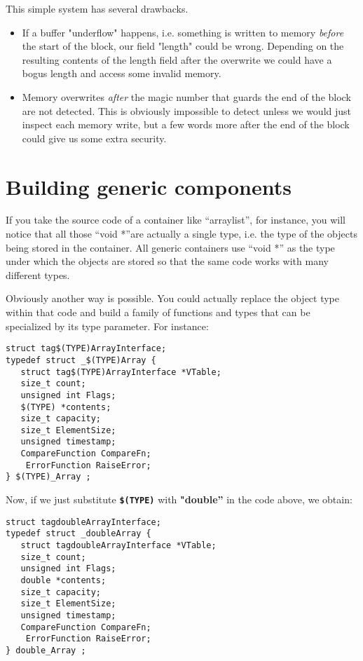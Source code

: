 \documentclass[12pt,a4paper]{memoir} %
\begin{document}
{{This simple system has several drawbacks.
\begin{itemize}
\item If a buffer "underflow" happens, i.e. something is written to memory \textsl{before} the start of the block, our field "length" could be
wrong. Depending on the resulting contents of the length field after the overwrite we could have a bogus length and access some invalid memory.
\item Memory overwrites \textsl{after} the magic number that guards the end of the block are not detected. This is obviously impossible to detect
unless we would just inspect each memory write, but a few words more after the end of the block could give us some extra security.
\end{itemize}
\chapter{Building generic components}

If you take the source code of a container like “arraylist”, for instance, you will notice that all those “void *”are actually a single type, i.e. the type of the objects being stored in the container.  All generic containers use “void *” as the type under which the objects are stored so that the same code works with many different types.

Obviously another way is possible. You could actually replace the object type within that code and build a family of functions and types that can be specialized by its type parameter. For instance:
\begin{verbatim}
struct tag$(TYPE)ArrayInterface;
typedef struct _$(TYPE)Array {
   struct tag$(TYPE)ArrayInterface *VTable; 
   size_t count;
   unsigned int Flags;
   $(TYPE) *contents;
   size_t capacity;
   size_t ElementSize;
   unsigned timestamp;
   CompareFunction CompareFn; 
    ErrorFunction RaiseError;
} $(TYPE)_Array ;
\end{verbatim}
Now, if we just substitute \textbf{ \texttt{\$(TYPE)}} with \textbf{"double”} in the code above, we obtain:

\begin{verbatim}
struct tagdoubleArrayInterface;
typedef struct _doubleArray {
   struct tagdoubleArrayInterface *VTable; 
   size_t count;
   unsigned int Flags;
   double *contents;
   size_t capacity;
   size_t ElementSize;
   unsigned timestamp;
   CompareFunction CompareFn; 
    ErrorFunction RaiseError;
} double_Array ;
\end{verbatim}

}}
\end{document}

